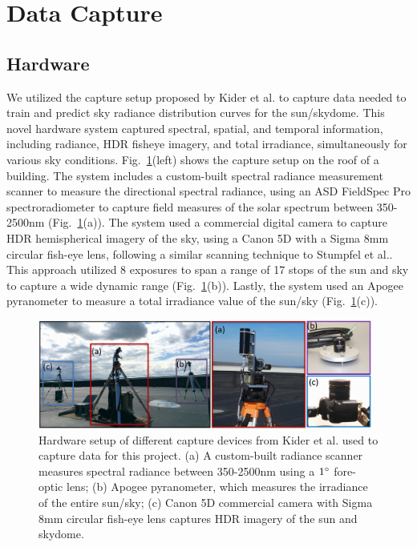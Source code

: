 \section{Data Capture}
\label{sec:datacapture}

\subsection{Hardware}
\label{sec:hardware}

We utilized the capture setup proposed by Kider et al. to capture data needed to train and predict sky radiance distribution curves for the sun/skydome\cite{kider_framework_2014}. This novel hardware system captured spectral, spatial, and temporal information, including radiance, HDR fisheye imagery, and total irradiance, simultaneously for various sky conditions. Fig.~\ref{fig:hardwarejtk}(left) shows the capture setup on the roof of a building. The system includes a custom-built spectral radiance measurement scanner to measure the directional spectral radiance, using an ASD FieldSpec Pro spectroradiometer to capture field measures of the solar spectrum between 350-2500nm (Fig.~\ref{fig:hardwarejtk}(a)). The system used a commercial digital camera to capture HDR hemispherical imagery of the sky, using a Canon 5D with a Sigma 8mm circular fish-eye lens, following a similar scanning technique to Stumpfel et al.\cite{Stumpfel:2004}. This approach utilized 8 exposures to span a range of 17 stops of the sun and sky to capture a wide dynamic range (Fig.~\ref{fig:hardwarejtk}(b)). Lastly, the system used an Apogee pyranometer to measure a total irradiance value of the sun/sky (Fig.~\ref{fig:hardwarejtk}(c)).

\begin{figure}[hbtp]
\begin{center}
\includegraphics[width=0.98\textwidth]{img/hardware.jpg}
\end{center}\vspace{-2mm}
\caption[hardwarejtk] {\label{fig:hardwarejtk} Hardware setup of different capture devices from Kider et al.\cite{kider_framework_2014} used to capture data for this project. (a) A custom-built radiance scanner measures spectral radiance between 350-2500nm using a $1\degree$ fore-optic lens; (b) Apogee pyranometer, which measures the irradiance of the entire sun/sky; (c) Canon 5D commercial camera with Sigma 8mm circular fish-eye lens captures HDR imagery of the sun and skydome.}
\end{figure}

